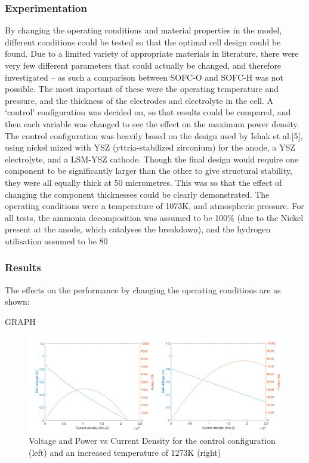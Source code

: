     \subsubsection{Experimentation}
    By changing the operating conditions and material properties in the model, different conditions could be tested so that the optimal cell design could be found. Due to a limited variety of appropriate materials in literature, there were very few different parameters that could actually be changed, and therefore investigated – as such a comparison between SOFC-O and SOFC-H was not possible. The most important of these were the operating temperature and pressure, and the thickness of the electrodes and electrolyte in the cell. A ‘control’ configuration was decided on, so that results could be compared, and then each variable was changed to see the effect on the maximum power density.
The control configuration was heavily based on the design used by Ishak et al.[5], using nickel mixed with YSZ (yttria-stabilized zirconium) for the anode, a YSZ electrolyte, and a LSM-YSZ cathode. Though the final design would require one component to be significantly larger than the other to give structural stability, they were all equally thick at 50 micrometres. This was so that the effect of changing the component thicknesses could be clearly demonstrated. The operating conditions were a temperature of 1073K, and atmospheric pressure. For all tests, the ammonia decomposition was assumed to be 100\% (due to the Nickel present at the anode, which catalyses the breakdown), and the hydrogen utilisation assumed to be 80%

    \subsubsection{Results}
    The effects on the performance by changing the operating conditions are as shown:
    
    GRAPH
    \begin{figure}[h!]
        \centering
        \includegraphics[width=1\textwidth]{controlvsinc_temp.png}
        \caption{Voltage and Power vs Current Density for the control configuration (left) and an increased temperature of 1273K (right)}
        \label{fig:SOFCtempinc}
    \end{figure}
    

